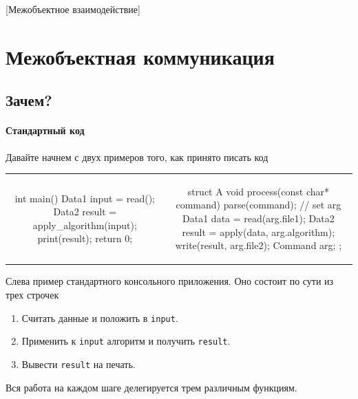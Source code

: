 [Межобъектное взаимодействие]


\section{Межобъектная коммуникация}

\subsection{Зачем?}

\paragraph{Стандартный код}

Давайте начнем с двух примеров того, как принято писать код
\begin{center}
\begin{tabular}{cc}
{
\begin{minipage}[\baselineskip]{8cm}
\begin{cppcode}[numbers = none]



int main() {
  Data1 input = read();
  Data2 result = apply_algorithm(input);
  print(result);
  return 0;
}
\end{cppcode}
\end{minipage}
}&{
\begin{minipage}[\baselineskip]{9cm}
\begin{cppcode}[numbers = none]
struct A {
  void process(const char* command) {
    parse(command); // set arg
    Data1 data = read(arg.file1);
    Data2 result = apply(data, arg.algorithm);
    write(result, arg.file2);
  }
  Command arg;
};
\end{cppcode}
\end{minipage}
}
\end{tabular}
\end{center}
Слева пример стандартного консольного приложения.
Оно состоит по сути из трех строчек
\begin{enumerate}
\item Считать данные и положить в \verb"input".

\item Применить к \verb"input" алгоритм и получить \verb"result".

\item Вывести \verb"result" на печать.
\end{enumerate}
Вся работа на каждом шаге делегируется трем различным функциям.
